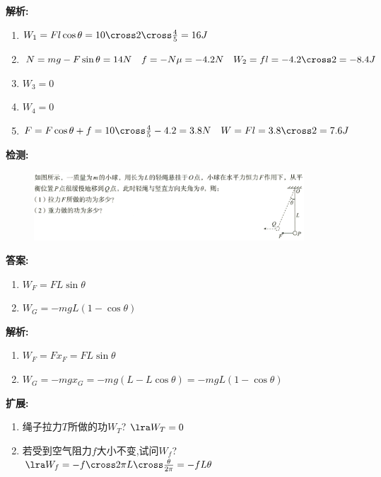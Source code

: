 \documentclass{article}
\begin{document}
\begin{itemize}
        \textbf{解析:} 
            \begin{enumerate}[label=(\arabic*)]
                \item $W_{1} = Fl\cos{\theta} = 10 \cross 2 \cross \frac{4}{5} = 16 J$
                \item $N = mg - F\sin{\theta} = 14 N \quad f = - N \mu = -4.2N \quad W_{2} = fl = -4.2 \cross 2 = -8.4J$
                \item $W_{3} = 0$
                \item $W_{4} = 0$
                \item $F = F\cos{\theta} + f = 10 \cross \frac{4}{5} - 4.2 = 3.8N \quad W = Fl = 3.8 \cross 2 = 7.6J$
            \end{enumerate}
        
        \vspace{2em}

        \textbf{检测:} 
        \begin{figure}[h]
            \centering
            \includegraphics[width=0.9\textwidth]{pictures/2.png}
        \end{figure}
        
        \vspace{1em}

        \textbf{答案:} 
            \begin{enumerate}[label=(\arabic*)]
                \item $W_{F} = FL\sin{\theta} $
                \item $W_{G} = -mgL(1-\cos{\theta})$
            \end{enumerate}

        \textbf{解析:} 
            \begin{enumerate}[label=(\arabic*)]
                \item $W_{F} = F x_{F} = F L \sin{\theta} $
                \item $W_{G} = -mg x_{G} = -mg(L - L \cos{\theta}) = -mgL(1-\cos{\theta})$
            \end{enumerate}

        \textbf{扩展:}
            \begin{enumerate}[label=(\arabic*)]
                \item 绳子拉力$T$所做的功$W_{T}$? $\lra W_{T} = 0$
                \item 若受到空气阻力$f$大小不变,试问$W_{f}$? $\lra W_{f} = -f \cross 2\pi L \cross \frac{\theta}{2 \pi} = -fL\theta $
            \end{enumerate}


\end{itemize}
\end{document}

